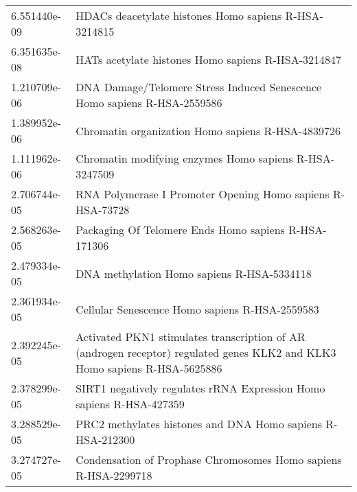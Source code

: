 \begin{longtable}{p{2.4cm}p{14.5cm}}
\bottomrule
\endlastfoot
             6.551440e-09 &                                                                                 HDACs deacetylate histones Homo sapiens R-HSA-3214815 \\
             6.351635e-08 &                                                                                    HATs acetylate histones Homo sapiens R-HSA-3214847 \\
             1.210709e-06 &                                                              DNA Damage/Telomere Stress Induced Senescence Homo sapiens R-HSA-2559586 \\
             1.389952e-06 &                                                                                     Chromatin organization Homo sapiens R-HSA-4839726 \\
             1.111962e-06 &                                                                                Chromatin modifying enzymes Homo sapiens R-HSA-3247509 \\
             2.706744e-05 &                                                                            RNA Polymerase I Promoter Opening Homo sapiens R-HSA-73728 \\
             2.568263e-05 &                                                                                  Packaging Of Telomere Ends Homo sapiens R-HSA-171306 \\
             2.479334e-05 &                                                                                            DNA methylation Homo sapiens R-HSA-5334118 \\
             2.361934e-05 &                                                                                        Cellular Senescence Homo sapiens R-HSA-2559583 \\
             2.392245e-05 &            Activated PKN1 stimulates transcription of AR (androgen receptor) regulated genes KLK2 and KLK3 Homo sapiens R-HSA-5625886 \\
             2.378299e-05 &                                                                  SIRT1 negatively regulates rRNA Expression Homo sapiens R-HSA-427359 \\
             3.288529e-05 &                                                                            PRC2 methylates histones and DNA Homo sapiens R-HSA-212300 \\
             3.274727e-05 &                                                                       Condensation of Prophase Chromosomes Homo sapiens R-HSA-2299718 \\

\end{longtable}
